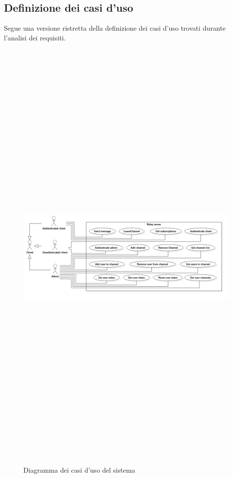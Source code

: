 	\subsection{Definizione dei casi d'uso}
		Segue una versione ristretta della definizione dei casi d'uso trovati durante l'analisi dei requisiti.
		\begin{figure}[H]
			\begin{center}
			\includegraphics[width=16.5cm,height=22.5cm,keepaspectratio]{UML/png/Use Case Model__Use Cases_0}
			\caption{Diagramma dei casi d'uso del sistema}
			\end{center}
		\end{figure}

